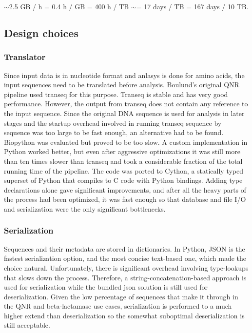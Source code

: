 \documentclass[a4paper,12pt]{article}
\begin{document}
$\sim$2.5 GB / h = 0.4 h / GB = 400 h / TB $\sim$= 17 days / TB = 167 days / 10 TB.


 
\subsection{Design choices}
\subsubsection{Translator}
Since input data is in nucleotide format and anlasys is done for amino acids, the input sequences need to be translated before analysis. Boulund's original QNR pipeline used transeq for this purpose. Transeq is stable and has very good performance. However, the output from transeq does not contain any reference to the input sequence. Since the original DNA sequence is used for analysis in later stages and the startup overhead involved in running transeq sequence by sequence was too large to be fast enough, an alternative had to be found. Biopython was evaluated but proved to be too slow. A custom implementation in Python worked better, but even after aggressive optimizations it was still more than ten times slower than transeq and took a considerable fraction of the total running time of the pipeline. The code was ported to Cython, a statically typed superset of Python that compiles to C code with Python bindings. Adding type declarations alone gave significant improvements, and after all the heavy parts of the process had been optimized, it was fast enough so that database and file I/O and serialization were the only significant bottlenecks.

\subsubsection{Serialization}
Sequences and their metadata are stored in dictionaries. In Python, JSON is the fastest serialization option, and the most concise text-based one, which made the choice natural. Unfortunately, there is significant overhead involving type-lookups that slows down the process. Therefore, a string-concatenation-based approach is used for serialization while the bundled json solution is still used for deserialization. Given the low percentage of sequences that make it through in the QNR and beta-lactamase use cases, serialization is performed to a much higher extend than deserialization so the somewhat suboptimal deserialization is still acceptable.

\printbibliography
\end{document}
